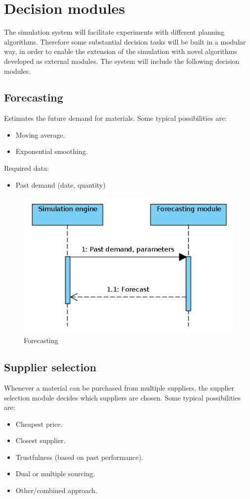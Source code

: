 \documentclass{article}
\begin{document}
\section{Decision modules}

The simulation system will facilitate experiments with different planning algorithms. Therefore some substantial decision tasks will be built in a modular way, in order to enable the extension of the simulation with novel algorithms developed as external modules. The system will include the following decision modules.

\subsection{Forecasting}

Estimates the future demand for materials. Some typical possibilities are:

\begin{itemize}
\item Moving average.
\item Exponential smoothing.
\end{itemize}

\noindent Required data:
\begin{itemize}
\item Past demand (date, quantity)
\end{itemize}

\begin{figure}[ht!]
	\center
	\includegraphics[width=.6\textwidth]{seq_fcst.png} 
	\caption{Forecasting}\label{fig:seq_fcst}
\end{figure}


\subsection{Supplier selection}

Whenever a material can be purchased from multiple suppliers, the supplier selection module decides which suppliers are chosen. Some typical possibilities are:
\begin{itemize}
\item Cheapest price.
\item Closest supplier.
\item Trustfulness (based on past performance).
\item Dual or multiple sourcing.
\item Other/combined approach.
\end{itemize}
\end{document}
